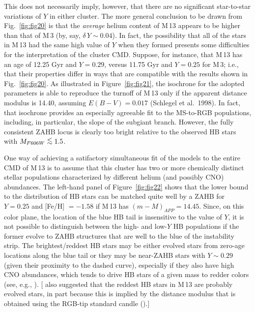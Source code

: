 \documentclass[12pt,preprint]{aastex}
\newcommand\lta{\mathrel{\hbox{\raise 0.6 ex \hbox{$<$}\kern
                   -1.8 ex\lower .5 ex\hbox{$\sim$}}}}
\begin{document}
This does not necessarily imply, however, that there are no significant
star-to-star variations of $Y$ in either cluster.  The more general conclusion
to be drawn from Fig.~\ref{fig:fig20} is that the {\it average} helium content
of M$\,$13 appears to be higher than that of M$\,$3 (by, say, $\delta\,Y \sim
0.04$).  In fact, the possibility that all of the stars in M$\,$13 had the same
high value of $Y$ when they formed presents some difficulties for the
interpretation of the cluster CMD.  Suppose, for instance, that M$\,$13 has an
age of 12.25 Gyr and $Y = 0.29$, versus 11.75 Gyr and $Y = 0.25$ for M$\,$3;
i.e., that their properties differ in ways that are compatible with the results
shown in Fig.~\ref{fig:fig20}.  As illustrated in Figure~\ref{fig:fig21}, the
isochrone for the adopted parameters is able to reproduce the turnoff of M$\,$13
only if the apparent distance modulus is 14.40, assuming $E(B-V) = 0.017$
(Schlegel et al.~1998).  In fact, that isochrone provides an especially
agreeable fit to the MS-to-RGB populations, including, in particular, the slope
of the subgiant branch.  However, the fully consistent ZAHB locus is clearly too
bright relative to the observed HB stars with $M_{F606W} \lta 1.5$.

One way of achieving a satifactory simultaneous fit of the models to the entire
CMD of M$\,$13 is to assume that this cluster has two or more chemically
distinct stellar populations characterized by different helium (and possibly
CNO) abundances.  The left-hand panel of Figure~\ref{fig:fig22} shows that the
lower bound to the distribution of HB stars can be matched quite well by a ZAHB
for $Y = 0.25$ and [Fe/H] $= -1.58$ if M$\,$13 has $(m-M)_{APP} = 14.45$.
Since, on this color plane, the location of the blue HB tail is insensitive to
the value of $Y$, it is not possible to distinguish between the high- and
low-$Y$ HB populations if the former evolve to ZAHB structures that are well to
the blue of the instability strip.  The brightest/reddest HB stars may be either
evolved stars from zero-age locations along the blue tail or they may be 
near-ZAHB stars with $Y \sim 0.29$ (given their proximity to the dashed curve),
especially if they also have high CNO abundances, which tends to drive HB stars
of a given mass to redder colors (see, e.g., \citealt{pcs09}).
[\citet{sgl10} also suggested that the reddest HB stars in M$\,$13 are probably
evolved stars, in part because this is implied by the distance modulus that is
obtained using the RGB-tip standard candle (\citealt{bfs04}).]
\end{document}
